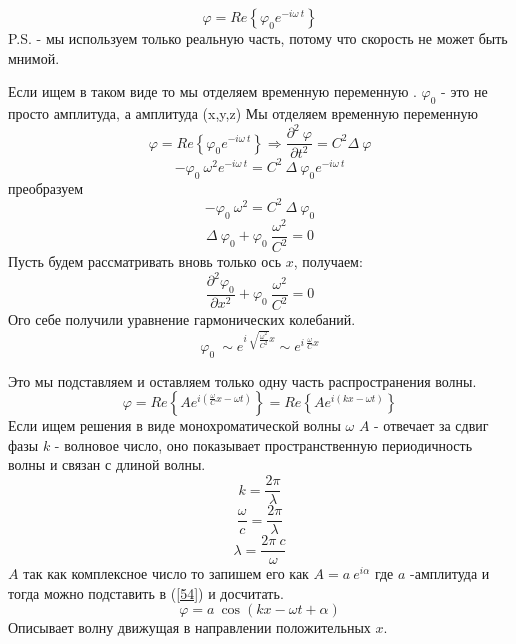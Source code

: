 \documentclass[14pt,a4paper,oneside]{extarticle}	%
\newcommand{\e}{e^{-i\omega\: t}}
\newcommand{\bracket}[1] {\left( #1 \right) } %
\newcommand{\dd}[1] {\partial #1 }
\begin{document}
\begin{equation*}
\varphi = Re\left\lbrace \varphi_{0}\e\right\rbrace 
\end{equation*}
P.S. - мы используем только реальную часть, потому что скорость не может быть мнимой.

Если ищем в таком виде то мы отделяем временную переменную .
$ \varphi_{0} $ - это не просто амплитуда, а амплитуда (x,y,z)
Мы отделяем временную переменную 
\begin{equation}\label{53}
\varphi = Re\left\lbrace \varphi_{0}\e\right\rbrace \Rightarrow \frac{\dd{^{2}\:\varphi}}{\dd{t^{2}}} = C^{2}\Delta\:\varphi
\end{equation}
\begin{equation*}
-\varphi_{0}\: \omega^{2}\e = C^{2}\:\Delta\: \varphi_{0}\e
\end{equation*}
преобразуем
\begin{equation*}
-\varphi_{0}\: \omega^{2} = C^{2}\:\Delta\: \varphi_{0}
\end{equation*}
\begin{equation*}
\Delta\: \varphi_{0} + \varphi_{0}\: \frac{\omega^{2}}{C^{2}} = 0 
\end{equation*}
Пусть будем рассматривать вновь только ось $ x $, получаем:
\begin{equation*}
\frac{\dd{^{2}\varphi_{0}}}{\dd{x^{2}}} + \varphi_{0}\: \frac{\omega^{2}}{C^{2}} = 0 
\end{equation*}
Ого себе получили уравнение гармонических колебаний.
\begin{equation*}
\varphi_{0}\: \sim e^{i\:\sqrt{\frac{\omega^{2}}{C^{2}}}x}\sim e^{i\:\frac{\omega}{C}x} 
\end{equation*}

Это мы подставляем и оставляем только одну часть распространения волны.
\begin{equation}\label{54}
\varphi =  Re\left\lbrace Ae^{i\bracket{\frac{\omega}{C}x - \omega t}} \right\rbrace = Re\left\lbrace Ae^{i\bracket{kx - \omega t}} \right\rbrace 
\end{equation}
Если ищем решения в виде монохроматической волны $ \omega $
$ A $ - отвечает за сдвиг фазы
$ k $ - волновое число, оно показывает пространственную периодичность волны и связан с длиной волны.
\begin{equation*}
k = \frac{2\pi}{\lambda}
\end{equation*}
\begin{equation*}
\frac{\omega}{c} = \frac{2\pi}{\lambda}
\end{equation*}
\begin{equation*}
\lambda = \frac{2\pi\: c}{\omega}
\end{equation*}
$ A $ так как комплексное число то запишем его как $ A = a\:e^{i\alpha} $
где $ a $ -амплитуда и тогда можно подставить в (\ref{54}) и досчитать.
\begin{equation*}
\varphi =  a\: \cos(kx-\omega t + \alpha)
\end{equation*}
Описывает волну движущая в направлении положительных $ x $.
\end{document}
